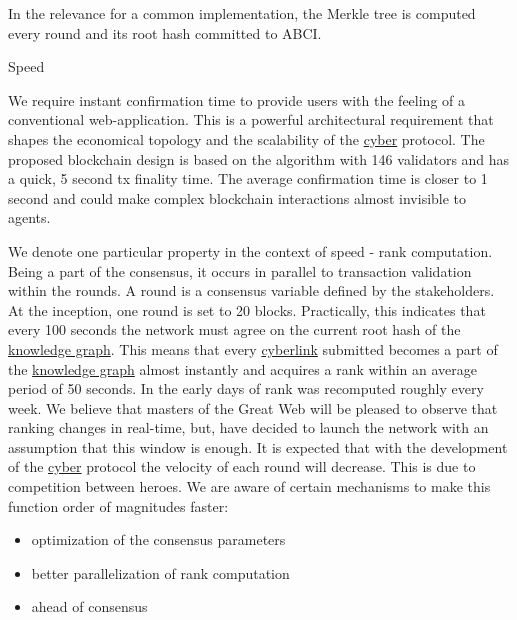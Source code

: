 \documentclass[8pt,oneside]{amsart}
\makeatletter
\newcommand{\linkred}[2]{\href{#1}{\color{red}{#2}}}
\newcommand{\linkgreen}[2]{\href{#1}{\color{green}{#2}}}
\renewcommand\subsection{\@startsection{subsection}
                                    {2}{\z@}
                                    {-3.25ex\@plus -1ex \@minus -.2ex}
                                    {0ex \@plus .2ex}
                                    {\play\Large}
                        }
\newcommand{\titleSection}[1]{\subsection{#1}}
\makeatother
\begin{document}
In the relevance for a common \linkred{https://github.ccom/cybercongress/go-cyber}{go-cyber} implementation, the Merkle tree is computed every round and its root hash committed to ABCI.

\titleSection{Speed}\label{speed}

We require instant confirmation time to provide users with the feeling of a conventional web-application. This is a powerful architectural requirement that shapes the economical topology and the scalability of the {\hyperref[cyber]{cyber}} protocol. The proposed blockchain design is based on the \linkgreen{https://ipfs.io/ipfs/QmaMtD7xDgghqgjN62zWZ5TBGFiEjGQtuZBjJ9sMh816KJ}{Tendermint consensus} algorithm with 146 validators and has a quick, 5 second tx finality time. The average confirmation time is closer to 1 second and could make complex blockchain interactions almost invisible to agents.

We denote one particular \linkred{https://github.com/cybercongress/go-cyber}{go-cyber} property in the context of speed - rank computation. Being a part of the consensus, it occurs in parallel to transaction validation within the rounds. A round is a consensus variable defined by the stakeholders. At the inception, one round is set to 20 blocks. Practically, this indicates that every 100 seconds the network must agree on the current root hash of the {\hyperref[knowledge-graph]{knowledge graph}}. This means that every {\hyperref[cyberlinks]{cyberlink}} submitted becomes a part of the {\hyperref[knowledge-graph]{knowledge graph}} almost instantly and acquires a rank within an average period of 50 seconds. In the early days of \linkred{https://google.com}{Google} rank was recomputed roughly every week. We believe that masters of the Great Web will be pleased to observe that ranking changes in real-time, but, have decided to launch the network with an assumption that this window is enough. It is expected that with the development of the {\hyperref[cyber]{cyber}} protocol the velocity of each round will decrease. This is due to competition between heroes. We are aware of certain mechanisms to make this function order of magnitudes faster:

\begin{itemize}
\item optimization of the consensus parameters
\item better parallelization of rank computation
\item \linkgreen{https://ipfs.io/ipfs/QmbsKzizZVVVzPbZvg1qSsNMkwmA3MFufgXb3MFqbSnmPs}{better clock} ahead of consensus
\end{itemize}
\end{document}

